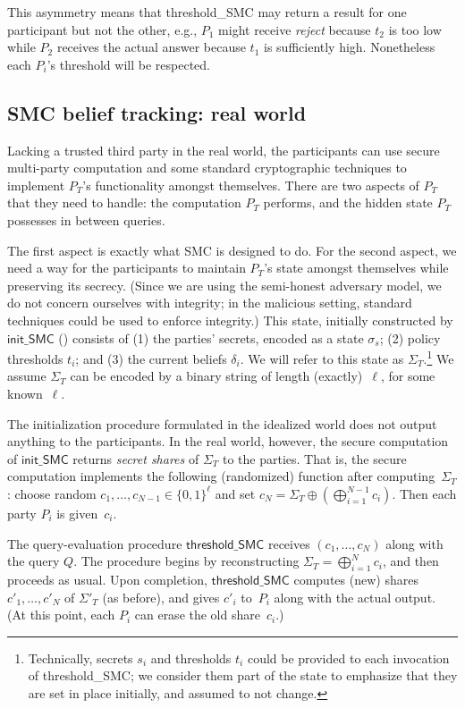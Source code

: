 \documentclass[10pt]{sigplanconf}
\begin{document}
This asymmetry means that \textsf{threshold\_SMC} may return a result
for one participant but not the other, e.g., $P_1$ might receive
\emph{reject} because $t_2$ is too low while $P_2$ receives the actual
answer because $t_1$ is sufficiently high.  Nonetheless each $P_i$'s
threshold will be respected.

\subsection{SMC belief tracking: real world}

Lacking a trusted third party in the real world, the participants
can use secure multi-party computation and some standard
cryptographic techniques to implement $ P_T $'s functionality amongst
themselves. There are two aspects of $ P_T $ that they need to handle:
the computation $ P_T $ performs, and the hidden state $ P_T $
possesses in between queries.

The first aspect is exactly what SMC is designed to do. For the second
aspect, we need a way for the participants to maintain $ P_T $'s state
amongst themselves while preserving its secrecy.  (Since we are using
the semi-honest adversary model, we do not concern ourselves with
integrity; in the malicious setting, standard techniques could be used
to enforce integrity.) This
state, initially constructed by $ \mathsf{init\_SMC} $
() consists of (1) the parties' secrets,
encoded as a state $ \sigma_s $; (2) policy thresholds $ t_i $; and
(3) the current beliefs $ \delta_i $.  We will refer to this state as
$ \Sigma_T $.\footnote{Technically, secrets $s_i$ and thresholds $t_i$
  could be provided to each invocation of \textsf{threshold\_SMC}; we
  consider them part of the state to emphasize that they are set in
  place initially, and assumed to not change.}
  We assume $\Sigma_T$ can be encoded by a binary string
  of length (exactly)~$\ell$, for some known~$\ell$.

The initialization procedure formulated in the idealized world does
not output anything to the participants. In the real world, however,
the secure computation of $ \mathsf{init\_{SMC}} $ returns \emph{secret shares}
of $\Sigma_T$ to the parties. That is, the secure computation implements
the following (randomized) function after computing~$\Sigma_T$:
choose random $c_1, \ldots, c_{N-1} \in \{0,1\}^\ell$
and set $c_N = \Sigma_T \oplus \left( \bigoplus_{i=1}^{N-1} c_i \right)$. Then each party $P_i$
is given~$c_i$.

The query-evaluation procedure $ \mathsf{threshold\_{SMC}} $ receives
$ (c_1, ..., c_N) $ along with the query $ Q $. The procedure begins by reconstructing
$\Sigma_T = \bigoplus_{i=1}^N c_i$,
and then
proceeds as usual.  Upon completion, $ \mathsf{threshold\_{SMC}} $
computes (new) shares $c'_1, \ldots, c'_N$ of $\Sigma'_T$ (as before), and gives $c'_i$ to~$P_i$
along with the actual output.
(At this point, each $P_i$ can erase the old share~$c_i$.)
\end{document}

